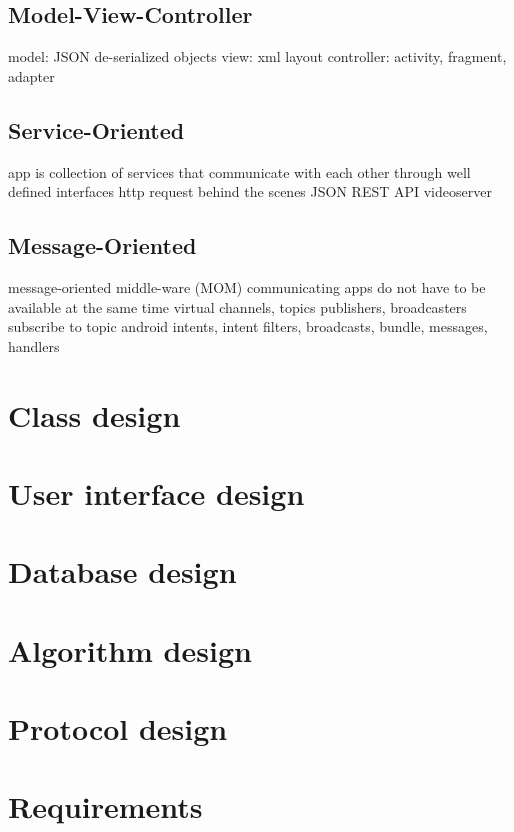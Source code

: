 \subsection{Model-View-Controller}
model: JSON de-serialized objects
view: xml layout
controller: activity, fragment, adapter

\subsection{Service-Oriented}
app is collection of services that communicate with each other through well defined interfaces
http request behind the scenes
JSON REST API
videoserver

\subsection{Message-Oriented}
message-oriented middle-ware (MOM)
communicating apps do not have to be available at the same time
virtual channels, topics
publishers, broadcasters
subscribe to topic
android intents, intent filters, broadcasts, bundle, messages, handlers

\section{Class design}

\section{User interface design}

\section{Database design}

\section{Algorithm design}

\section{Protocol design}


\section{Requirements} %

